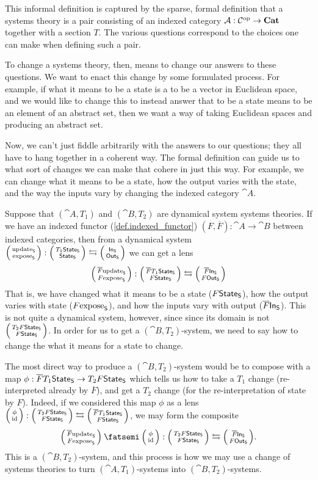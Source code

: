 \documentclass[DynamicalBook]{subfiles}
\begin{document}
This informal definition is captured by the sparse, formal definition that a
systems theory is a pair consisting of an indexed category $\mathcal{A} : \mathcal{C}^{\textnormal{op}} \to
\textbf{Cat}$ together with a section $T$. The various questions correspond to the
choices one can make when defining such a pair.

To change a systems theory, then, means to change our answers to these questions. We
want to enact this change by some formulated process. For example, if what it
means to be a state is a to be a vector in Euclidean space, and we would like to
change this to instead answer that to be a state means to be an element of an
abstract set, then we want a way of taking Euclidean spaces and producing an
abstract set.

Now, we can't just fiddle arbitrarily with the answers to our questions; they
all have to hang together in a coherent way. The formal definition can guide us
to what sort of changes we can make that cohere in just this way. For example, we can change
what it means to be a state, how the output varies with the state, and the way
the inputs vary by changing the indexed category $\cat{A}$. 

Suppose that $(\cat{A}, T_1)$ and $(\cat{B}, T_2)$ are dynamical system
systems theories. If we have an indexed functor (\cref{def.indexed_functor}) $(F, \overline{F}) :
\cat{A} \to \cat{B}$ between indexed categories, then from a dynamical system
$\lens{\update{S}}{\expose{S}} : \lens{T_1\State{S}}{\State{S}} \fromto
\lens{\In{S}}{\Out{S}}$ we can get a lens 
\[
\lens{\overline{F}\update{S}}{F\expose{S}} : \lens{\overline{F}T_1
  \State{S}}{F\State{S}} \fromto \lens{\overline{F}\In{S}}{F\Out{S}}
\]
That is, we have changed what it means to be a state ($F\mathsf{State}_{\mathsf{S}}$), how the
output varies with state ($F\mathrm{expose}_{\mathsf{S}}$), and how the inputs vary with output
($\overline{F}\mathsf{In}_{\mathsf{S}}$).
This is not quite a dynamical system, however, since since its domain is not
$\lens{T_2 F\State{S}}{F\State{S}}$. In order for us to get a $(\cat{B},
T_2)$-system, we need to say how to change the what it means for a state to
change. 

The most direct way to produce a $(\cat{B}, T_2)$-system would be to compose
with a map $\phi : \overline{F}T_1 \mathsf{State}_{\mathsf{S}} \to T_2 F\mathsf{State}_{\mathsf{S}}$ which
tells us how to take a $T_1$ change (re-interpreted already by $\overline{F}$),
and get a $T_2$ change (for the re-interpretation of state by $F$). Indeed, if
we considered this map $\phi$ as a lens $\lens{\phi}{\id} : \lens{T_2 F \State{S}}{F \State{S}} \fromto \lens{\overline{F}T_1 \State{S}}{F
  \State{S}}$, we may form the composite
\[
\lens{\overline{F}\update{S}}{F\expose{S}} \then \lens{\phi}{\id} : \lens{T_2 F
  \State{S}}{F \State{S}} \fromto \lens{\overline{F}\In{S}}{F\Out{S}}.
\]
This is a $(\cat{B}, T_2)$-system, and this process is how we may use a change
of systems theories to turn $(\cat{A}, T_1)$-systems into $(\cat{B},T_2)$-systems.
\end{document}
